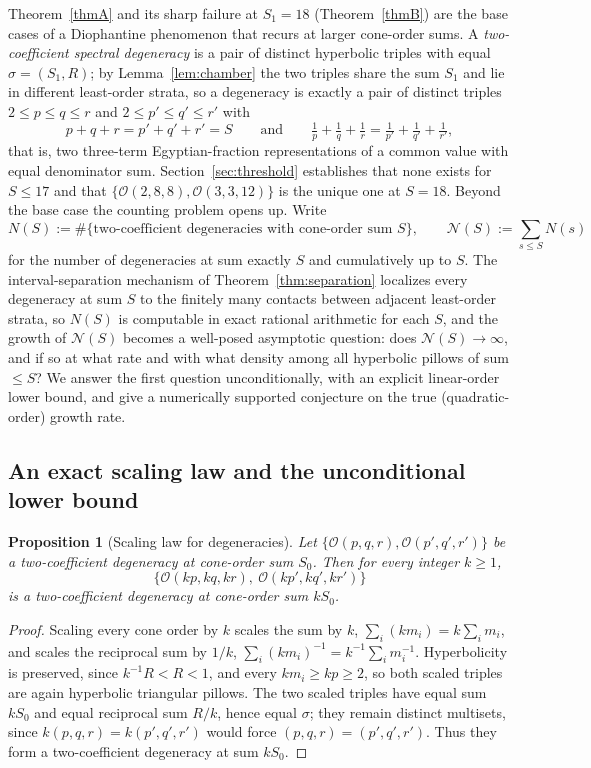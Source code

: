\documentclass[12pt, letterpaper]{article}
\theoremstyle{definition}
\theoremstyle{plain}
\newtheorem{proposition}[theorem]{Proposition}
\begin{document}
Theorem~\ref{thmA} and its sharp failure at $S_1=18$ (Theorem~\ref{thmB}) are the base cases of a Diophantine phenomenon that recurs at larger cone-order sums. A \emph{two-coefficient spectral degeneracy} is a pair of distinct hyperbolic triples with equal $\sigma=(S_1,R)$; by Lemma~\ref{lem:chamber} the two triples share the sum $S_1$ and lie in different least-order strata, so a degeneracy is exactly a pair of distinct triples $2\le p\le q\le r$ and $2\le p'\le q'\le r'$ with
\[
    p+q+r=p'+q'+r'=S \qquad\text{and}\qquad \tfrac1p+\tfrac1q+\tfrac1r=\tfrac1{p'}+\tfrac1{q'}+\tfrac1{r'},
\]
that is, two three-term Egyptian-fraction representations of a common value with equal denominator sum. Section~\ref{sec:threshold} establishes that none exists for $S\le17$ and that $\{\mathcal{O}(2,8,8),\mathcal{O}(3,3,12)\}$ is the unique one at $S=18$. Beyond the base case the counting problem opens up. Write
\[
    N(S):=\#\{\text{two-coefficient degeneracies with cone-order sum }S\},\qquad
    \mathcal{N}(S):=\sum_{s\le S}N(s)
\]
for the number of degeneracies at sum exactly $S$ and cumulatively up to $S$. The interval-separation mechanism of Theorem~\ref{thm:separation} localizes every degeneracy at sum $S$ to the finitely many contacts between adjacent least-order strata, so $N(S)$ is computable in exact rational arithmetic for each $S$, and the growth of $\mathcal{N}(S)$ becomes a well-posed asymptotic question: does $\mathcal{N}(S)\to\infty$, and if so at what rate and with what density among all hyperbolic pillows of sum $\le S$? We answer the first question unconditionally, with an explicit linear-order lower bound, and give a numerically supported conjecture on the true (quadratic-order) growth rate.

\subsection{An exact scaling law and the unconditional lower bound}

\begin{proposition}[Scaling law for degeneracies]\label{prop:scaling}
Let $\{\mathcal O(p,q,r),\mathcal O(p',q',r')\}$ be a two-coefficient degeneracy at cone-order sum $S_0$. Then for every integer $k\ge1$,
\[
    \{\mathcal O(kp,kq,kr),\ \mathcal O(kp',kq',kr')\}
\]
is a two-coefficient degeneracy at cone-order sum $kS_0$.
\end{proposition}
\begin{proof}
Scaling every cone order by $k$ scales the sum by $k$, $\sum_i(km_i)=k\sum_i m_i$, and scales the reciprocal sum by $1/k$, $\sum_i(km_i)^{-1}=k^{-1}\sum_i m_i^{-1}$. Hyperbolicity is preserved, since $k^{-1}R<R<1$, and every $km_i\ge k p\ge2$, so both scaled triples are again hyperbolic triangular pillows. The two scaled triples have equal sum $kS_0$ and equal reciprocal sum $R/k$, hence equal $\sigma$; they remain distinct multisets, since $k(p,q,r)=k(p',q',r')$ would force $(p,q,r)=(p',q',r')$. Thus they form a two-coefficient degeneracy at sum $kS_0$.
\end{proof}
\end{document}
